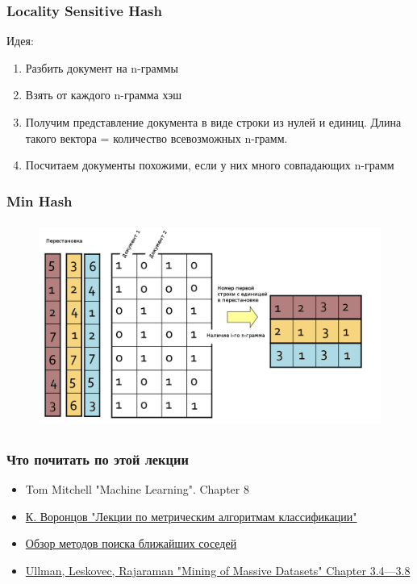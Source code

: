\documentclass[10pt]{beamer}
\begin{document}
\begin{frame}\frametitle{Locality Sensitive Hash}
	\alert{Идея}: \\
	\begin{enumerate}
	\item Разбить документ на n-граммы
	\item Взять от каждого n-грамма хэш
	\item Получим представление документа в виде строки из нулей и единиц. Длина такого вектора = количество всевозможных n-грамм.
	\item Посчитаем документы похожими, если у них много совпадающих n-грамм
	\end{enumerate}
\end{frame}

\begin{frame}\frametitle{Min Hash}
	\begin{figure}[htbp]
	\centering
	\includegraphics[height=190pt]{images/min-hash1}  
	\end{figure}
\end{frame}

\begin{frame}\frametitle{Что почитать по этой лекции}
  \begin{itemize}
    \item Tom Mitchell "Machine Learning". Chapter 8
    \item \href{http://www.ccas.ru/voron/download/MetricAlgs.pdf}{К. Воронцов "Лекции по метрическим алгоритмам классификации"}
    \item \href{https://arxiv.org/pdf/1007.0085.pdf}{Обзор методов поиска ближайших соседей}
    \item \href{http://infolab.stanford.edu/~ullman/mmds/book.pdf}{Ullman, Leskovec, Rajaraman "Mining of Massive Datasets" Chapter 3.4—3.8}
      
  \end{itemize}

\end{frame}
\end{document}
